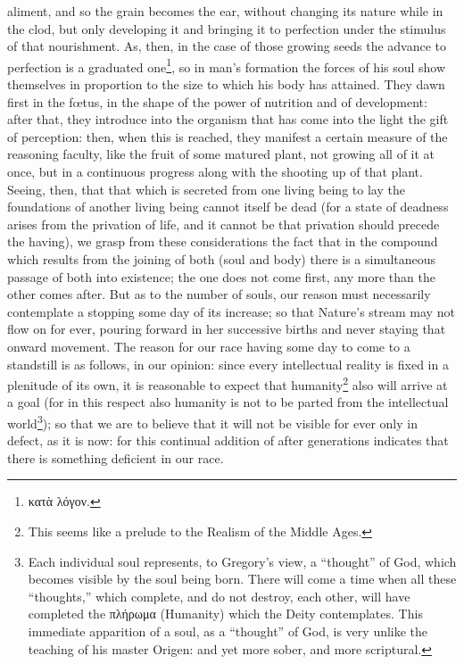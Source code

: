 aliment, and so the grain becomes the ear, without changing its nature while in the clod, but only developing it and bringing it to perfection under the stimulus of that nourishment. As, then, in the case of those growing seeds the advance to perfection is a graduated one\footnote{\textgreek{κατὰ λόγον}.}, so in man’s formation the forces of his soul show themselves in proportion to the size to which his body has attained. They dawn first in the fœtus, in the shape of the power of nutrition and of development: after that, they introduce into the organism that has come into the light the gift of perception: then, when this is reached, they manifest a certain measure of the reasoning faculty, like the fruit of some matured plant, not growing all of it at once, but in a continuous progress along with the shooting up of that plant. Seeing, then, that that which is secreted from one living being to lay the foundations of another living being cannot itself be dead (for a state of deadness arises from the privation of life, and it cannot be that privation should precede the having), we grasp from these considerations the fact that in the compound which results from the joining of both (soul and body) there is a simultaneous passage of both into existence; the one does not come first, any more than the other comes after. But as to the number of souls, our reason must necessarily contemplate a stopping some day of its increase; so that Nature’s stream may not flow on for ever, pouring forward in her successive births and never staying that onward movement. The reason for our race having some day to come to a standstill is as follows, in our opinion: since every intellectual reality is fixed in a plenitude of its own, it is reasonable to expect that humanity\footnote{This seems like a prelude to the Realism of the Middle Ages.} also will arrive at a goal (for in this respect also humanity is not to be parted from the intellectual world\footnote{Each individual soul represents, to Gregory’s view, a “thought” of God, which becomes visible by the soul being born. There will come a time when all these “thoughts,” which complete, and do not destroy, each other, will have completed the \textgreek{πλήρωμα} (Humanity) which the Deity contemplates. This immediate apparition of a soul, as a “thought” of God, is very unlike the teaching of his master Origen: and yet more sober, and more scriptural.}); so that we are to believe that it will not be visible for ever only in defect, as it is now: for this continual addition of after generations indicates that there is something deficient in our race.

